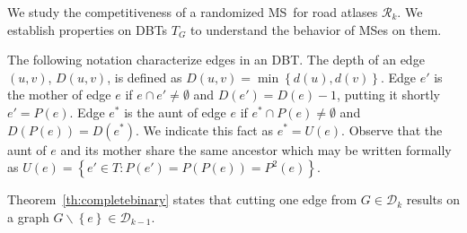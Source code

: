 \documentclass[preprint]{elsarticle}
\newcommand{\set}[1]{\left\{ #1 \right\}}
\newcommand{\mcalr}{\mathcal{R}}
\newcommand{\mcald}{\mathcal{D}}
\newcommand{\mts}{MS}
\newcommand{\ebt}{DBT}
\begin{document}
We study the competitiveness of a randomized \mts ~for road atlases $\mcalr_k$. We establish properties on \ebt s $T_G$ to understand the behavior of \mts es on them. 

The following notation characterize edges in an \ebt . The depth of an edge $(u,v)$, $D(u,v)$, is defined as $D(u,v) = \min \set{d(u),d(v)}$. Edge $e'$ is the mother of edge $e$ if $e \cap e' \neq \emptyset$ and $D(e') = D(e) - 1$, putting it shortly $e' = P(e)$. Edge $e^*$ is the aunt of edge $e$ if $e^* \cap P(e) \neq \emptyset$ and $D\left(P(e)\right) = D(e^*)$. We indicate this fact as $e^* = U(e)$. Observe that the aunt of $e$ and its mother share the same ancestor which may be written formally as $U(e) = \set{e' \in T: P(e') = P(P(e)) = P^2(e)}$.

Theorem~\ref{th:completebinary} states that cutting one edge from $G \in \mcald_k$ results on a graph $G \backslash \set{e} \in \mcald_{k-1}$.
\end{document}
